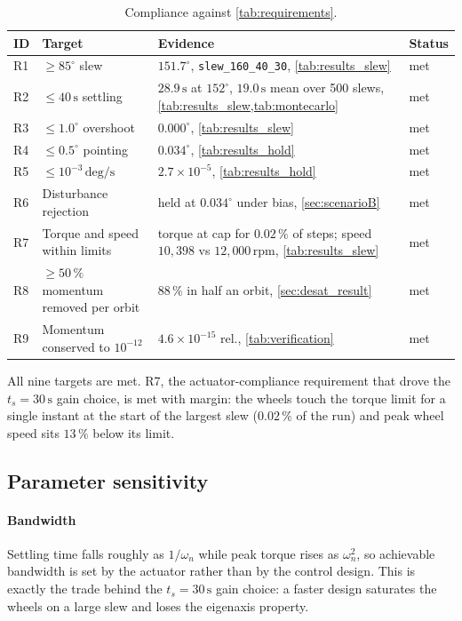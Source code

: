 \documentclass[conference,10pt,a4paper]{IEEEtran}
\newcommand{\unit}[1]{\ensuremath{\,\mathrm{#1}}}
\begin{document}
\begin{table}[!t]
\centering
\caption{Compliance against \cref{tab:requirements}.}
\label{tab:compliance}
\footnotesize
\begin{tabularx}{\textwidth}{@{}llXl@{}}
\toprule
\textbf{ID} & \textbf{Target} & \textbf{Evidence} & \textbf{Status} \\
\midrule
R1 & $\ge85^\circ$ slew          & $151.7^\circ$, \texttt{slew\_160\_40\_30}, \cref{tab:results_slew} & met \\
R2 & $\le40\unit{s}$ settling    & $28.9\unit{s}$ at $152^\circ$, $19.0\unit{s}$ mean over 500 slews, \cref{tab:results_slew,tab:montecarlo} & met \\
R3 & $\le1.0^\circ$ overshoot    & $0.000^\circ$, \cref{tab:results_slew} & met \\
R4 & $\le0.5^\circ$ pointing     & $0.034^\circ$, \cref{tab:results_hold} & met \\
R5 & $\le10^{-3}\unit{deg/s}$    & $2.7\times10^{-5}$, \cref{tab:results_hold} & met \\
R6 & Disturbance rejection       & held at $0.034^\circ$ under bias, \cref{sec:scenarioB} & met \\
R7 & Torque and speed within limits & torque at cap for $0.02\,\%$ of steps; speed $10{,}398$ vs $12{,}000\unit{rpm}$, \cref{tab:results_slew} & met \\
R8 & $\ge50\,\%$ momentum removed per orbit & $88\,\%$ in half an orbit, \cref{sec:desat_result} & met \\
R9 & Momentum conserved to $10^{-12}$ & $4.6\times10^{-15}$ rel., \cref{tab:verification} & met \\
\bottomrule
\end{tabularx}
\end{table}

All nine targets are met. R7, the actuator-compliance requirement that drove the
$t_s=30\unit{s}$ gain choice, is met with margin: the wheels touch the torque
limit for a single instant at the start of the largest slew ($0.02\,\%$ of the
run) and peak wheel speed sits $13\,\%$ below its limit.

\subsection{Parameter sensitivity}
\label{sec:sensitivity}

\paragraph{Bandwidth} Settling time falls roughly as $1/\omega_n$ while peak
torque rises as $\omega_n^2$, so achievable bandwidth is set by the actuator
rather than by the control design. This is exactly the trade behind the
$t_s=30\unit{s}$ gain choice: a faster design saturates the wheels on a large
slew and loses the eigenaxis property.
\end{document}
